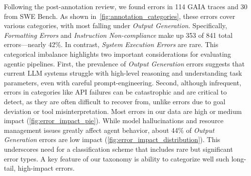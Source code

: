 \documentclass[11pt]{article}
\begin{document}
Following the post-annotation review, we found errors in 114 GAIA traces and 30 from SWE Bench. As shown in~\autoref{fig:annotation_categories}, these errors cover various categories, with most falling under \textit{Output Generation}. Specifically, \textit{Formatting Errors} and \textit{Instruction Non-compliance} make up 353 of 841 total errors—nearly 42\%. In contrast, \textit{System Execution Errors} are rare. This categorical imbalance highlights two important considerations for evaluating agentic pipelines. First, the prevalence of \textit{Output Generation} errors suggests that current LLM systems struggle with high-level reasoning and understanding task parameters, even with careful prompt-engineering. Second, although infrequent, errors in categories like API failures can be catastrophic and are critical to detect, as they are often difficult to recover from, unlike errors due to goal deviation or tool misinterpretation. Most errors in our data are high or medium impact (\autoref{fig:error_impact_pie}). While model hallucinations and resource management issues greatly affect agent behavior, about 44\% of \textit{Output Generation} errors are low impact (\autoref{fig:error_impact_distribution}). This underscores need for a classification scheme that includes rare but significant error types. A key feature of our taxonomy is ability to categorize well such long-tail, high-impact errors.


\end{document}
